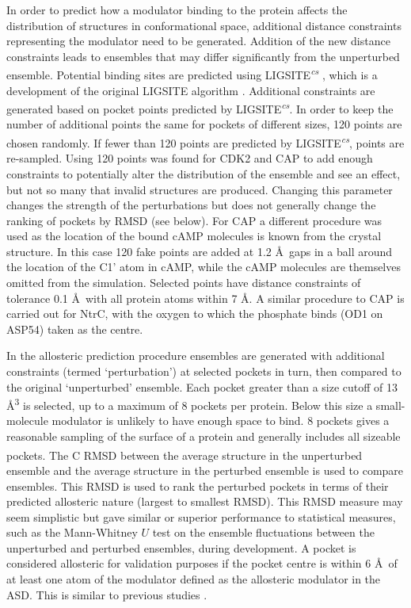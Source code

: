 In order to predict how a modulator binding to the protein affects the distribution of structures in conformational space, additional distance constraints representing the modulator need to be generated.
Addition of the new distance constraints leads to ensembles that may differ significantly from the unperturbed ensemble.
Potential binding sites are predicted using LIGSITE\textsuperscript{\it cs} \cite{Huang2006}, which is a development of the original LIGSITE algorithm \cite{Hendlich1997}.
Additional constraints are generated based on pocket points predicted by LIGSITE\textsuperscript{\it cs}.
In order to keep the number of additional points the same for pockets of different sizes, 120 points are chosen randomly.
If fewer than 120 points are predicted by LIGSITE\textsuperscript{\it cs}, points are re-sampled.
Using 120 points was found for CDK2 and CAP to add enough constraints to potentially alter the distribution of the ensemble and see an effect, but not so many that invalid structures are produced.
Changing this parameter changes the strength of the perturbations but does not generally change the ranking of pockets by RMSD (see below).
For CAP a different procedure was used as the location of the bound cAMP molecules is known from the crystal structure.
In this case 120 fake points are added at 1.2 \AA\ gaps in a ball around the location of the C1' atom in cAMP, while the cAMP molecules are themselves omitted from the simulation.
Selected points have distance constraints of tolerance 0.1 \AA\ with all protein atoms within 7 \AA.
A similar procedure to CAP is carried out for NtrC, with the oxygen to which the phosphate binds (OD1 on ASP54) taken as the centre.

In the allosteric prediction procedure ensembles are generated with additional constraints (termed `perturbation') at selected pockets in turn, then compared to the original `unperturbed' ensemble.
Each pocket greater than a size cutoff of 13 \AA\textsuperscript{3} is selected, up to a maximum of 8 pockets per protein.
Below this size a small-molecule modulator is unlikely to have enough space to bind.
8 pockets gives a reasonable sampling of the surface of a protein and generally includes all sizeable pockets.
The C\textsuperscript{\textalpha} RMSD between the average structure in the unperturbed ensemble and the average structure in the perturbed ensemble is used to compare ensembles.
This RMSD is used to rank the perturbed pockets in terms of their predicted allosteric nature (largest to smallest RMSD).
This RMSD measure may seem simplistic but gave similar or superior performance to statistical measures, such as the Mann-Whitney $U$ test on the ensemble fluctuations between the unperturbed and perturbed ensembles, during development.
A pocket is considered allosteric for validation purposes if the pocket centre is within 6 \AA\ of at least one atom of the modulator defined as the allosteric modulator in the ASD.
This is similar to previous studies \cite{Panjkovich2012}.



